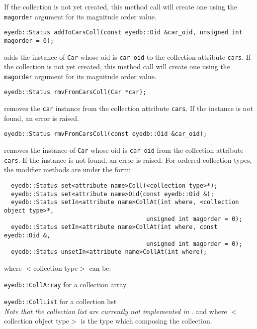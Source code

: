 If the collection is not yet created, this method call will create one
using the \texttt{magorder} argument for its magnitude order value.
\item
\verbsize
\begin{verbatim}
eyedb::Status addToCarsColl(const eyedb::Oid &car_oid, unsigned int magorder = 0);
\end{verbatim}
\normalsize
adds the instance of \texttt{Car} whose oid is \texttt{car\_oid}
to the collection attribute \texttt{cars}.
If the collection is not yet created, this method call will create one
using the \texttt{magorder} argument for its magnitude order value.
\item
\verbsize
\begin{verbatim}
eyedb::Status rmvFromCarsColl(Car *car);
\end{verbatim}
\normalsize
removes the \texttt{car} instance from the collection attribute \texttt{cars}.
If the instance is not found, an error is raised.
\item
\verbsize
\begin{verbatim}
eyedb::Status rmvFromCarsColl(const eyedb::Oid &car_oid);
\end{verbatim}
\normalsize
removes the instance of \texttt{Car} whose oid is \texttt{car\_oid}
from the collection attribute \texttt{cars}.
If the instance is not found, an error is raised.
\ee
For ordered collection types, the modifier methods are under the form:
\verbsize
\begin{verbatim}
  eyedb::Status set<attribute name>Coll(<collection type>*);
  eyedb::Status set<attribute name>Oid(const eyedb::Oid &);
  eyedb::Status setIn<attribute name>CollAt(int where, <collection object type>*,
                                        unsigned int magorder = 0);
  eyedb::Status setIn<attribute name>CollAt(int where, const eyedb::Oid &,
                                        unsigned int magorder = 0);
  eyedb::Status unsetIn<attribute name>CollAt(int where);
\end{verbatim}
\normalsize
where $<$collection type$>$ can be:
\be
\item \texttt{eyedb::CollArray} for a collection array
\item \texttt{eyedb::CollList} for a collection list\\
\emph{Note that the collection list are currently not implemented in
\eyedb}.
\ee
and where $<$collection object type$>$ is the type which composing
the collection.
\\
\\
